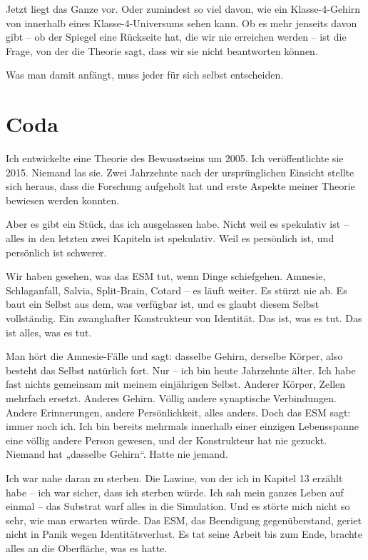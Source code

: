 \documentclass[11pt, twoside, openright]{book}
\begin{document}
Jetzt liegt das Ganze vor. Oder zumindest so viel davon, wie ein Klasse-4-Gehirn von innerhalb eines Klasse-4-Universums sehen kann. Ob es mehr jenseits davon gibt -- ob der Spiegel eine Rückseite hat, die wir nie erreichen werden -- ist die Frage, von der die Theorie sagt, dass wir sie nicht beantworten können.

Was man damit anfängt, muss jeder für sich selbst entscheiden.


\chapter*{Coda}

Ich entwickelte eine Theorie des Bewusstseins um 2005. Ich veröffentlichte sie 2015. Niemand las sie. Zwei Jahrzehnte nach der ursprünglichen Einsicht stellte sich heraus, dass die Forschung aufgeholt hat und erste Aspekte meiner Theorie bewiesen werden konnten.

Aber es gibt ein Stück, das ich ausgelassen habe. Nicht weil es spekulativ ist -- alles in den letzten zwei Kapiteln ist spekulativ. Weil es persönlich ist, und persönlich ist schwerer.

Wir haben gesehen, was das ESM tut, wenn Dinge schiefgehen. Amnesie, Schlaganfall, Salvia, Split-Brain, Cotard -- es läuft weiter. Es stürzt nie ab. Es baut ein Selbst aus dem, was verfügbar ist, und es glaubt diesem Selbst vollständig. Ein zwanghafter Konstrukteur von Identität. Das ist, was es tut. Das ist alles, was es tut.

Man hört die Amnesie-Fälle und sagt: dasselbe Gehirn, derselbe Körper, also besteht das Selbst natürlich fort. Nur -- ich bin heute Jahrzehnte älter. Ich habe fast nichts gemeinsam mit meinem einjährigen Selbst. Anderer Körper, Zellen mehrfach ersetzt. Anderes Gehirn. Völlig andere synaptische Verbindungen. Andere Erinnerungen, andere Persönlichkeit, alles anders. Doch das ESM sagt: immer noch ich. Ich bin bereits mehrmals innerhalb einer einzigen Lebensspanne eine völlig andere Person gewesen, und der Konstrukteur hat nie gezuckt. Niemand hat „dasselbe Gehirn“. Hatte nie jemand.

Ich war nahe daran zu sterben. Die Lawine, von der ich in Kapitel 13 erzählt habe -- ich war sicher, dass ich sterben würde. Ich sah mein ganzes Leben auf einmal -- das Substrat warf alles in die Simulation. Und es störte mich nicht so sehr, wie man erwarten würde. Das ESM, das Beendigung gegenüberstand, geriet nicht in Panik wegen Identitätsverlust. Es tat seine Arbeit bis zum Ende, brachte alles an die Oberfläche, was es hatte.
\end{document}
